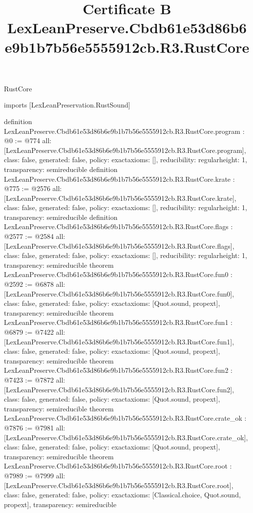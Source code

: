 \begin{lexlean}{RustCore}
\title{Certificate B LexLeanPreserve.Cbdb61e53d86b6e9b1b7b56e5555912cb.R3.RustCore}
\begin{coremodule}
imports [LexLeanPreservation.RustSound]

definition LexLeanPreserve.Cbdb61e53d86b6e9b1b7b56e5555912cb.R3.RustCore.program : @0 := @774 {
  all: [LexLeanPreserve.Cbdb61e53d86b6e9b1b7b56e5555912cb.R3.RustCore.program],
  class: false,
  generated: false,
  policy: exact{axioms: []},
  reducibility: regular{height: 1},
  transparency: semireducible
}
definition LexLeanPreserve.Cbdb61e53d86b6e9b1b7b56e5555912cb.R3.RustCore.krate : @775 := @2576 {
  all: [LexLeanPreserve.Cbdb61e53d86b6e9b1b7b56e5555912cb.R3.RustCore.krate],
  class: false,
  generated: false,
  policy: exact{axioms: []},
  reducibility: regular{height: 1},
  transparency: semireducible
}
definition LexLeanPreserve.Cbdb61e53d86b6e9b1b7b56e5555912cb.R3.RustCore.flags : @2577 := @2584 {
  all: [LexLeanPreserve.Cbdb61e53d86b6e9b1b7b56e5555912cb.R3.RustCore.flags],
  class: false,
  generated: false,
  policy: exact{axioms: []},
  reducibility: regular{height: 1},
  transparency: semireducible
}
theorem LexLeanPreserve.Cbdb61e53d86b6e9b1b7b56e5555912cb.R3.RustCore.fun0 : @2592 := @6878 {
  all: [LexLeanPreserve.Cbdb61e53d86b6e9b1b7b56e5555912cb.R3.RustCore.fun0],
  class: false,
  generated: false,
  policy: exact{axioms: [Quot.sound, propext]},
  transparency: semireducible
}
theorem LexLeanPreserve.Cbdb61e53d86b6e9b1b7b56e5555912cb.R3.RustCore.fun1 : @6879 := @7422 {
  all: [LexLeanPreserve.Cbdb61e53d86b6e9b1b7b56e5555912cb.R3.RustCore.fun1],
  class: false,
  generated: false,
  policy: exact{axioms: [Quot.sound, propext]},
  transparency: semireducible
}
theorem LexLeanPreserve.Cbdb61e53d86b6e9b1b7b56e5555912cb.R3.RustCore.fun2 : @7423 := @7872 {
  all: [LexLeanPreserve.Cbdb61e53d86b6e9b1b7b56e5555912cb.R3.RustCore.fun2],
  class: false,
  generated: false,
  policy: exact{axioms: [Quot.sound, propext]},
  transparency: semireducible
}
theorem LexLeanPreserve.Cbdb61e53d86b6e9b1b7b56e5555912cb.R3.RustCore.crate_ok : @7876 := @7981 {
  all: [LexLeanPreserve.Cbdb61e53d86b6e9b1b7b56e5555912cb.R3.RustCore.crate_ok],
  class: false,
  generated: false,
  policy: exact{axioms: [Quot.sound, propext]},
  transparency: semireducible
}
theorem LexLeanPreserve.Cbdb61e53d86b6e9b1b7b56e5555912cb.R3.RustCore.root : @7989 := @7999 {
  all: [LexLeanPreserve.Cbdb61e53d86b6e9b1b7b56e5555912cb.R3.RustCore.root],
  class: false,
  generated: false,
  policy: exact{axioms: [Classical.choice, Quot.sound, propext]},
  transparency: semireducible
}


\end{coremodule}
\end{lexlean}
